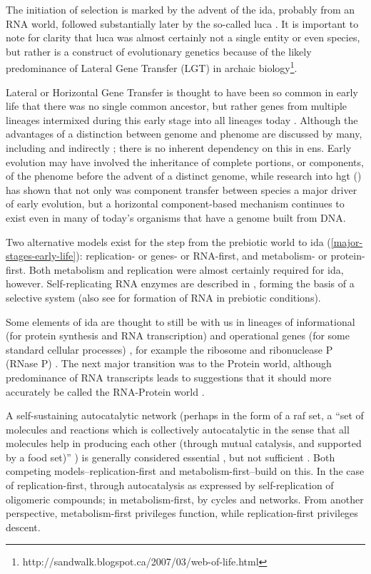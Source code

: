 The initiation of selection is marked by the advent of the \gls{ida}, probably from an RNA world, followed substantially later by the so-called \gls{luca} \parencite{Yarus2011}. It is important to note for clarity that \gls{luca} was almost certainly not a single entity or even species, but rather is a construct of evolutionary genetics because of the likely predominance of Lateral Gene Transfer (LGT) in archaic biology\footnote{http://sandwalk.blogspot.ca/2007/03/web-of-life.html}. 

Lateral or Horizontal Gene Transfer is thought to have been so common in early life that there was no single common ancestor, but rather genes from multiple lineages intermixed during this early stage into all lineages today \parencite{Ragan2009}. Although the advantages of a distinction between genome and phenome are discussed by many, including \parencite[section 7.2.3]{Taylor1999} and indirectly \textcite{VonNeumann1966}; there is no inherent dependency on this in \gls{ens}. Early evolution may have involved the inheritance of complete portions, or components, of the phenome before the advent of a distinct genome, while research into \gls{hgt} (\eg \textcite{Ochman2000,Pace:2008vi,Ragan2009}) has shown that not only was component transfer between species a major driver of early evolution, but a horizontal component-based mechanism continues to exist even in many of today's organisms that have a genome built from DNA. 

Two alternative models exist for the step from the prebiotic world  to \gls{ida} (\cref{major-stages-early-life}): replication- or genes- or RNA-first, and metabolism- or protein-first. Both metabolism and replication were almost certainly required for \gls{ida}, however. Self-replicating RNA enzymes are described in \textcite{Lincoln2009}, forming the basis of a selective system (also see \textcite{Cheng2010,Powner2009} for formation of RNA in prebiotic conditions). 

Some elements of \gls{ida}  are thought to still be with us in lineages of informational (for protein synthesis and RNA transcription) and operational genes (for some standard cellular processes) \parencite{Ragan2009}, for example the ribosome and ribonuclease P (RNase P) \parencite{Wilson2009}. The next major transition was to the Protein world, although predominance of RNA transcripts leads to suggestions that it should more accurately be called the RNA-Protein world \parencite{Altman2013}. 

A self-sustaining autocatalytic network (perhaps in the form of a \gls{raf} set, a ``set of molecules and reactions which is collectively autocatalytic in the sense that all molecules help in producing each other (through mutual catalysis, and supported by a food set)'' \parencite{Hordijk2011}) is generally considered essential \parencite{Pross2013}, but not sufficient \parencite{Hordijk2011}. Both competing models--replication-first and metabolism-first--build on this. In the case of replication-first, through autocatalysis as expressed by self-replication of oligomeric compounds; in metabolism-first, by cycles and networks. From another perspective, metabolism-first privileges function, while replication-first privileges descent.

